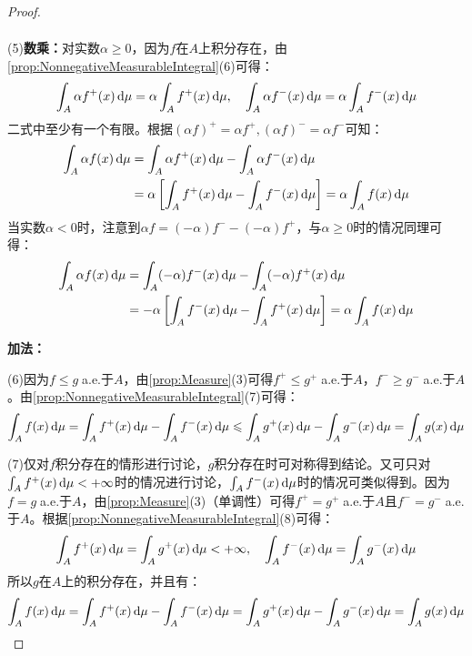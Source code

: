 \begin{proof}
\begin{gather*}
	\end{gather*}\par
	(5)\textbf{数乘：}对实数$\alpha\geqslant0$，因为$f$在$A$上积分存在，由\cref{prop:NonnegativeMeasurableIntegral}(6)可得：
	\begin{equation*}
		\int_{A}\alpha f^+(x)\mathop{}\!\mathrm{d}\mu=\alpha\int_{A}f^+(x)\mathop{}\!\mathrm{d}\mu,\quad\int_{A}\alpha f^-(x)\mathop{}\!\mathrm{d}\mu=\alpha\int_{A}f^-(x)\mathop{}\!\mathrm{d}\mu
	\end{equation*}
	二式中至少有一个有限。根据$(\alpha f)^+=\alpha f^+,(\alpha f)^-=\alpha f^-$可知：
	\begin{align*}
		\int_{A}\alpha f(x)\mathop{}\!\mathrm{d}\mu&=\int_{A}\alpha f^+(x)\mathop{}\!\mathrm{d}\mu-\int_{A}\alpha f^-(x)\mathop{}\!\mathrm{d}\mu \\
		&=\alpha\left[\int_{A}f^+(x)\mathop{}\!\mathrm{d}\mu-\int_{A}f^-(x)\mathop{}\!\mathrm{d}\mu\right]=\alpha\int_{A}f(x)\mathop{}\!\mathrm{d}\mu
	\end{align*}
	当实数$\alpha<0$时，注意到$\alpha f=(-\alpha)f^--(-\alpha)f^+$，与$\alpha\geqslant0$时的情况同理可得：
	\begin{align*}
		\int_{A}\alpha f(x)\mathop{}\!\mathrm{d}\mu&=\int_{A}(-\alpha)f^-(x)\mathop{}\!\mathrm{d}\mu-\int_{A}(-\alpha)f^+(x)\mathop{}\!\mathrm{d}\mu \\
		&=-\alpha\left[\int_{A}f^-(x)\mathop{}\!\mathrm{d}\mu-\int_{A}f^+(x)\mathop{}\!\mathrm{d}\mu\right]=\alpha\int_{A}f(x)\mathop{}\!\mathrm{d}\mu
	\end{align*}\par
	\textbf{加法：}\par
	(6)因为$f\leqslant g\;$a.e.于$A$，由\cref{prop:Measure}(3)可得$f^+\leqslant g^+\;$a.e.于$A$，$f^-\geqslant g^-\;$a.e.于$A$。由\cref{prop:NonnegativeMeasurableIntegral}(7)可得：
	\begin{equation*}
		\int_{A}f(x)\mathop{}\!\mathrm{d}\mu=\int_{A}f^+(x)\mathop{}\!\mathrm{d}\mu-\int_{A}f^-(x)\mathop{}\!\mathrm{d}\mu\leqslant\int_{A}g^+(x)\mathop{}\!\mathrm{d}\mu-\int_{A}g^-(x)\mathop{}\!\mathrm{d}\mu=\int_{A}g(x)\mathop{}\!\mathrm{d}\mu
	\end{equation*}
	\par
	(7)仅对$f$积分存在的情形进行讨论，$g$积分存在时可对称得到结论。又可只对$\int_{A}f^+(x)\mathop{}\!\mathrm{d}\mu<+\infty$时的情况进行讨论，$\int_{A}f^-(x)\mathop{}\!\mathrm{d}\mu$时的情况可类似得到。因为$f=g\;$a.e.于$A$，由\cref{prop:Measure}(3)（单调性）可得$f^+=g^+\;$a.e.于$A$且$f^-=g^-\;$a.e.于$A$。根据\cref{prop:NonnegativeMeasurableIntegral}(8)可得：
	\begin{equation*}
		\int_{A}f^+(x)\mathop{}\!\mathrm{d}\mu=\int_{A}g^+(x)\mathop{}\!\mathrm{d}\mu<+\infty,\quad\int_{A}f^-(x)\mathop{}\!\mathrm{d}\mu=\int_{A}g^-(x)\mathop{}\!\mathrm{d}\mu
	\end{equation*}
	所以$g$在$A$上的积分存在，并且有：
	\begin{equation*}
		\int_{A}f(x)\dif\mu=\int_{A}f^+(x)\dif\mu-\int_{A}f^-(x)\dif\mu=\int_{A}g^+(x)\dif\mu-\int_{A}g^-(x)\dif\mu=\int_{A}g(x)\dif\mu

\end{equation*}
\end{proof}

